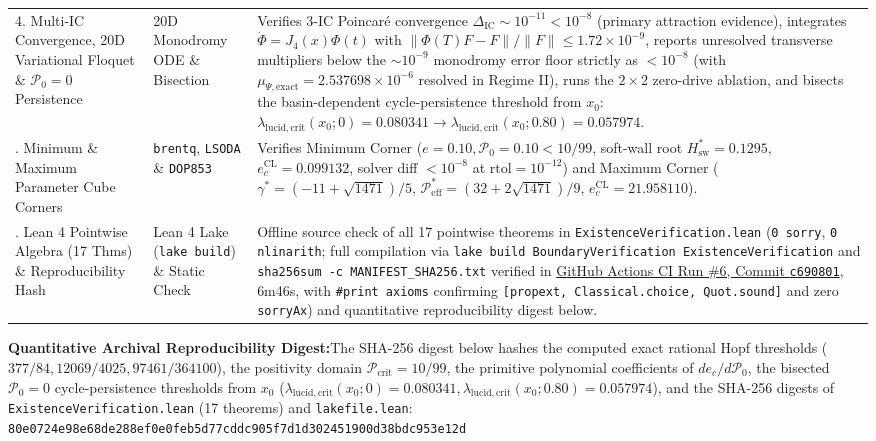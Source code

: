 \documentclass[11pt,a4paper]{article}
\newcommand{\takeaway}[2]{%
  \vspace{6pt}\noindent\colorbox{primary!8}{%
    \parbox{\dimexpr\textwidth-2\fboxsep\relax}{%
      \vspace{4pt}\textbf{\color{primary}#1:}\hspace{0.5em}#2\vspace{4pt}%
    }%
  }\vspace{6pt}%
}
\theoremstyle{definition}
\begin{document}
\begin{table}[ht!]
{\begin{tabularx}{\textwidth}{@{}p{36mm}p{32mm}X@{}}
4. Multi-IC Convergence, 20D Variational Floquet \& $\mathcal{P}_0=0$ Persistence & 20D Monodromy ODE \& Bisection & Verifies 3-IC Poincar\'e convergence $\Delta_{\mathrm{IC}} \sim 10^{-11} < 10^{-8}$ (primary attraction evidence), integrates $\dot{\Phi} = J_4(x)\Phi(t)$ with $\|\Phi(T)F - F\|/\|F\| \le 1.72 \times 10^{-9}$, reports unresolved transverse multipliers below the $\sim 10^{-9}$ monodromy error floor strictly as $< 10^{-8}$ (with $\mu_{\Psi,\mathrm{exact}} = 2.537698\times 10^{-6}$ resolved in Regime II), runs the $2\times 2$ zero-drive ablation, and bisects the basin-dependent cycle-persistence threshold from $x_0$: $\lambda_{\mathrm{lucid,crit}}(x_0; 0) = 0.080341 \to \lambda_{\mathrm{lucid,crit}}(x_0; 0.80) = 0.057974$. \\
\addlinespace[2pt]
5. Minimum \& Maximum Parameter Cube Corners & \texttt{brentq}, \texttt{LSODA} \& \texttt{DOP853} & Verifies Minimum Corner ($e=0.10, \mathcal{P}_0=0.10 < 10/99$, soft-wall root $H_{\mathrm{sw}}^* = 0.1295$, $e_c^{\mathrm{CL}}=0.099132$, solver diff $< 10^{-8}$ at $\mathrm{rtol}=10^{-12}$) and Maximum Corner ($\gamma^* = (-11+\sqrt{1471})/5$, $\mathcal{P}_{\mathrm{eff}}^* = (32+2\sqrt{1471})/9$, $e_c^{\mathrm{CL}}=21.958110$). \\
\addlinespace[2pt]
6. Lean 4 Pointwise Algebra (17 Thms) \& Reproducibility Hash & Lean 4 Lake (\texttt{lake build}) \& Static Check & Offline source check of all 17 pointwise theorems in \texttt{ExistenceVerification.lean} (\texttt{0 sorry}, \texttt{0 nlinarith}; full compilation via \texttt{lake build BoundaryVerification ExistenceVerification} and \texttt{sha256sum -c MANIFEST\_SHA256.txt} verified in \href{https://github.com/reggaesharkk/theory-of-bounded-existence/commit/c690801}{GitHub Actions CI Run \#6, Commit \texttt{c690801}}, 6m46s, with \texttt{\#print axioms} confirming \texttt{[propext, Classical.choice, Quot.sound]} and zero \texttt{sorryAx}) and quantitative reproducibility digest below. \\
\bottomrule
\end{tabularx}%
}
\end{table}

\takeaway{Quantitative Archival Reproducibility Digest}{The SHA-256 digest below hashes the computed exact rational Hopf thresholds ($377/84, 12069/4025, 97461/364100$), the positivity domain $\mathcal{P}_{\mathrm{crit}} = 10/99$, the primitive polynomial coefficients of $de_c/d\mathcal{P}_0$, the bisected $\mathcal{P}_0 = 0$ cycle-persistence thresholds from $x_0$ ($\lambda_{\mathrm{lucid,crit}}(x_0; 0) = 0.080341, \lambda_{\mathrm{lucid,crit}}(x_0; 0.80) = 0.057974$), and the SHA-256 digests of \texttt{ExistenceVerification.lean} (17 theorems) and \texttt{lakefile.lean}:\\[4pt]
\centering\texttt{80e0724e98e68de288ef0e0feb5d77cddc905f7d1d302451900d38bdc953e12d}}
\end{document}
